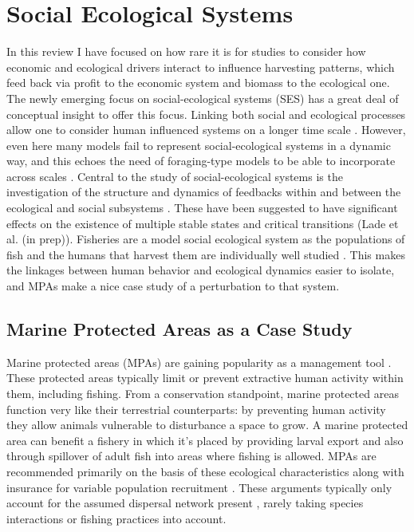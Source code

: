 \documentclass[12pt,a4paper]{report}
\begin{document}
\section{Social Ecological Systems}
In this review I have focused on how rare it is for studies to consider how economic and ecological drivers interact to influence harvesting patterns, which feed back via profit to the economic system and biomass to the ecological one. The newly emerging focus on social-ecological systems (SES) has a great deal of conceptual insight to offer this focus. Linking both social and ecological processes allow one to consider human influenced systems on a longer time scale \citep{Schluteretal:2012, Ostrom:2009, Liuetal:2007, Liuetal:2007b}. However, even here many models fail to represent social-ecological systems in a dynamic way, and this echoes the need of foraging-type models to be able to incorporate across scales \citep{Janssenetal:2000}. Central to the study of social-ecological systems is the investigation of the structure and dynamics of feedbacks within and between the ecological and social subsystems  \citep{MacyWiller:2002, JeffreyMcintosh:2006}. These have been suggested to have significant effects on the existence of multiple stable states and critical transitions (Lade et al. (in prep)). Fisheries are a model social ecological system as the populations of fish and the humans that harvest them are individually well studied \citep{Branchetal:2006}. This makes the linkages between human behavior and ecological dynamics easier to isolate, and MPAs make a nice case study of a perturbation to that system. 

\subsection{Marine Protected Areas as a Case Study}
Marine protected areas (MPAs) are gaining popularity as a management tool \citep{Halpernetal:2012}. These protected areas typically limit or prevent extractive human activity within them, including fishing. From a conservation standpoint, marine protected areas function very like their terrestrial counterparts: by preventing human activity they allow animals vulnerable to disturbance a space to grow. A marine protected area can benefit a fishery in which it's placed by providing larval export and also through spillover of adult fish into areas where fishing is allowed. MPAs are recommended primarily on the basis of these ecological characteristics \citep{GellRoberts:2003} along with insurance for variable population recruitment \citep{KahuiAlexander:2008,Gainesetal:2010}. These arguments typically only account for the assumed dispersal network present \citep{Sanchirico:2004, Sanchirico:2005}, rarely taking species interactions or fishing practices into account.
\end{document}
